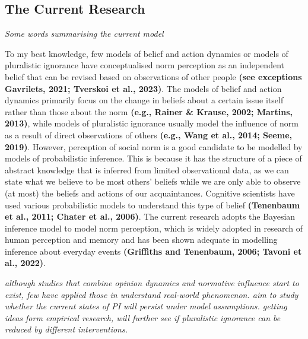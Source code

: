 \documentclass[
  11pt,
]{article}
\begin{document}
\hypertarget{the-current-research}{%
\subsection{The Current Research}\label{the-current-research}}

\emph{Some words summarising the current model}

To my best knowledge, few models of belief and action dynamics or models
of pluralistic ignorance have conceptualised norm perception as an
independent belief that can be revised based on observations of other
people \textbf{(see exceptions Gavrilets, 2021; Tverskoi et al., 2023)}.
The models of belief and action dynamics primarily focus on the change
in beliefs about a certain issue itself rather than those about the norm
\textbf{(e.g., Rainer \& Krause, 2002; Martins, 2013)}, while models of
pluralistic ignorance usually model the influence of norm as a result of
direct observations of others \textbf{(e.g., Wang et al., 2014; Seeme,
2019)}. However, perception of social norm is a good candidate to be
modelled by models of probabilistic inference. This is because it has
the structure of a piece of abstract knowledge that is inferred from
limited observational data, as we can state what we believe to be most
others' beliefs while we are only able to observe (at most) the beliefs
and actions of our acquaintances. Cognitive scientists have used various
probabilistic models to understand this type of belief
\textbf{(Tenenbaum et al., 2011; Chater et al., 2006)}. The current
research adopts the Bayesian inference model to model norm perception,
which is widely adopted in research of human perception and memory and
has been shown adequate in modelling inference about everyday events
\textbf{(Griffiths and Tenenbaum, 2006; Tavoni et al., 2022)}.

\emph{although studies that combine opinion dynamics and normative
influence start to exist, few have applied those in understand
real-world phenomenon. aim to study whether the current states of PI
will persist under model assumptions. getting ideas form empirical
research, will further see if pluralistic ignorance can be reduced by
different interventions.}
\end{document}
